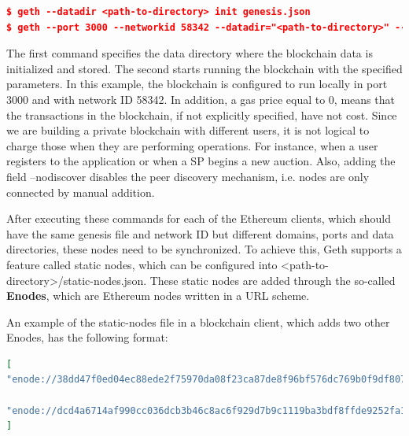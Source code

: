 \begin{lstlisting}[language=JSON,caption={Example of the two Geth commands used to start running the blockchain.}, label={lst:GethCommands}]
$ geth --datadir <path-to-directory> init genesis.json
$ geth --port 3000 --networkid 58342 --datadir="<path-to-directory>" --maxpeers=3 --rpc --rpcport 8545 --rpcaddr 127.0.0.1 --rpccorsdomain "http://localhost:8000" --rpcapi "eth,net,web3,personal" --gasprice "0" --nodiscover console
\end{lstlisting}

The first command specifies the data directory where the blockchain data is initialized and stored. The second starts running the blockchain with the specified parameters. In this example, the blockchain is configured to run locally in port 3000 and with network ID 58342. In addition, a gas price equal to 0, means that the transactions in the blockchain, if not explicitly specified, have not cost. Since we are building a private blockchain with different users, it is not logical to charge those when they are performing operations. For instance, when a user registers to the application or when a SP begins a new auction. Also, adding the field --nodiscover disables the peer discovery mechanism, i.e. nodes are only connected by manual addition. 

After executing these commands for each of the Ethereum clients, which should have the same genesis file and network ID but different domains, ports and data directories, these nodes need to be synchronized. To achieve this, Geth supports a feature called static nodes, which can be configured into <path-to-directory>/static-nodes.json. These static nodes are added through the so-called \textbf{Enodes}, which are Ethereum nodes written in a URL scheme. 

An example of the static-nodes file in a blockchain client, which adds two other Enodes, has the following format:

\begin{lstlisting}[language=JSON,caption={Example of a static-nodes.json file that adds two other blockchain nodes.}, label={lst:ENodes}]
[
"enode://38dd47f0ed04ec88ede2f75970da08f23ca87de8f96bf576dc769b0f9df807782d3729bc83b99042a3eb193ff 091cb4715a0906e5e902fb5adc04af91f3a7ba7@[::]:3010?discport=0",

"enode://dcd4a6714af990cc036dcb3b46c8ac6f929d7b9c1119ba3bdf8ffde9252fa17204bac84c3afae9c53b38c4a 0dacccd2c52ac832ec723c5ff5e29546402c09737@[::]:3015?discport=0"
]
\end{lstlisting}


